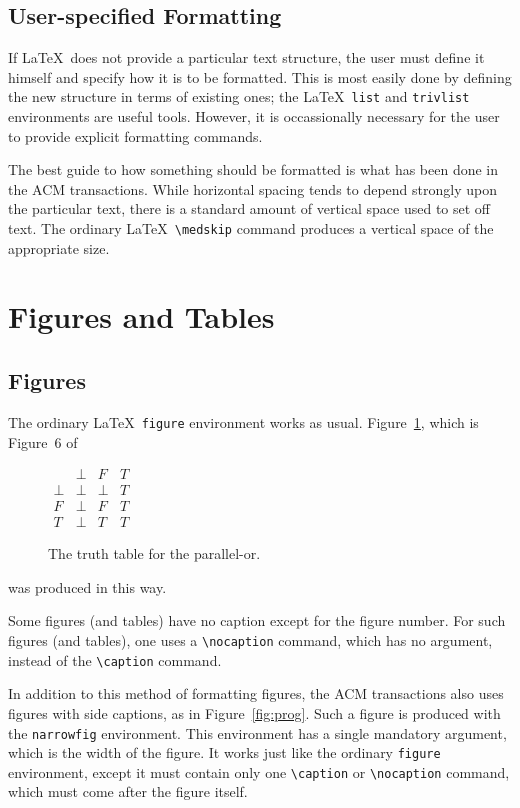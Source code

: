 \subsection{User-specified Formatting}

If \LaTeX\ does not provide a particular text structure, the user must
define it himself and specify how it is to be formatted.  This is most
easily done by defining the new structure in terms of existing ones;
the \LaTeX\ {\tt list} and {\tt trivlist} environments are useful
tools.  However, it is occassionally necessary for the user to provide
explicit formatting commands.  

The best guide to how something should be formatted is what has been
done in the ACM transactions.  While horizontal spacing tends to depend
strongly upon the particular text, there is a standard amount of
vertical space used to set off text.  The ordinary \LaTeX\ 
\verb|\medskip| command produces a vertical space of the appropriate
size.

\section{Figures and Tables}

\subsection{Figures}

The ordinary \LaTeX\ {\tt figure} environment works as usual.
Figure~\ref{fig:ordinary}, which is Figure~6 of 
\begin{figure}
\centering
\(\begin{array}{c|ccc}
     & \bot & F & T \\
\hline
\bot & \bot & \bot & T \\
F    & \bot & F    & T \\
T    & \bot & T    & T
\end{array}\)
\caption{The truth table for the parallel-or.}
\label{fig:ordinary}
\end{figure}
was produced in this way.  

Some figures (and tables) have no caption except for the figure number.
For such figures (and tables), one uses a \verb|\nocaption| command,
which has no argument, instead of the \verb|\caption| command.

In addition to this method of formatting figures, the ACM transactions
also uses figures with side captions, as in Figure~\ref{fig:prog}.
Such a figure is produced with the {\tt narrowfig} environment.  This
environment has a single mandatory argument, which is the width of the
figure.  It works just like the ordinary {\tt figure} environment,
except it must contain only one \verb|\caption| or \verb|\nocaption|
command, which must come after the figure itself.  

